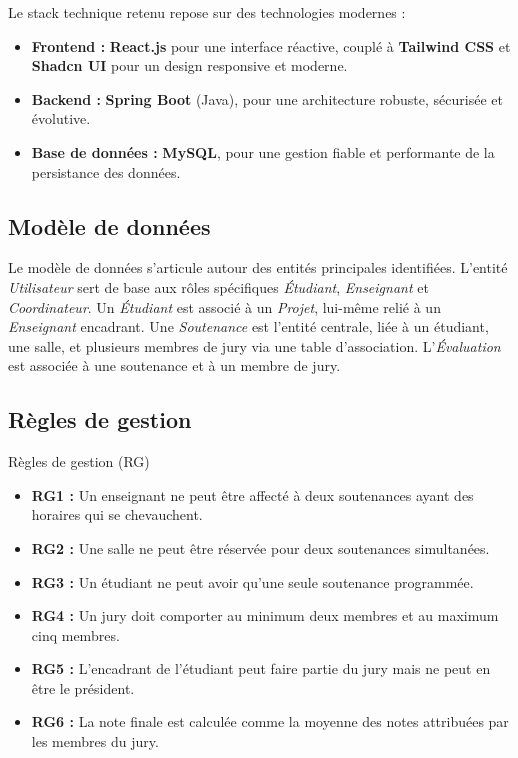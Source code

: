 \documentclass[12pt,a4paper]{article}
\begin{document}
Le stack technique retenu repose sur des technologies modernes :

\begin{itemize}[label=\textcolor{primary}{\textbullet}]
    \item \textbf{Frontend :} \textbf{React.js} pour une interface réactive,
          couplé à \textbf{Tailwind CSS} et \textbf{Shadcn UI} pour un design responsive et moderne.
    \item \textbf{Backend :} \textbf{Spring Boot} (Java), pour une architecture
          robuste, sécurisée et évolutive.
    \item \textbf{Base de données :} \textbf{MySQL}, pour une gestion fiable
          et performante de la persistance des données.
\end{itemize}

\subsection{Modèle de données}
\label{subsec:modele_donnees}

Le modèle de données s'articule autour des entités principales identifiées.
L'entité \textit{Utilisateur} sert de base aux rôles spécifiques
\textit{Étudiant}, \textit{Enseignant} et \textit{Coordinateur}. Un
\textit{Étudiant} est associé à un \textit{Projet}, lui-même relié à un
\textit{Enseignant} encadrant. Une \textit{Soutenance} est l'entité centrale,
liée à un étudiant, une salle, et plusieurs membres de jury via une table
d'association. L'\textit{Évaluation} est associée à une soutenance et à un
membre de jury.

\subsection{Règles de gestion}
\label{subsec:regles}

\begin{projectbox}{Règles de gestion (RG)}
    \begin{itemize}[label=\textcolor{primary}{\textbullet}, leftmargin=1.5cm]
        \item \textbf{RG1 :} Un enseignant ne peut être affecté à deux
              soutenances ayant des horaires qui se chevauchent.
        \item \textbf{RG2 :} Une salle ne peut être réservée pour deux
              soutenances simultanées.
        \item \textbf{RG3 :} Un étudiant ne peut avoir qu'une seule soutenance
              programmée.
        \item \textbf{RG4 :} Un jury doit comporter au minimum deux membres et
              au maximum cinq membres.
        \item \textbf{RG5 :} L'encadrant de l'étudiant peut faire partie du jury
              mais ne peut en être le président.
        \item \textbf{RG6 :} La note finale est calculée comme la moyenne des
              notes attribuées par les membres du jury.
    \end{itemize}
\end{projectbox}
\end{document}

